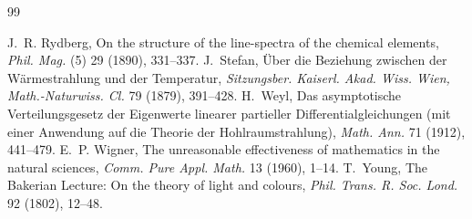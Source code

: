 \documentclass[11pt]{article}
\begin{document}
\begin{thebibliography}{99}
\begin{sloppypar}
 J.~R. Rydberg, On the structure of the line-spectra of the chemical elements, \emph{Phil. Mag.} (5) 29 (1890), 331--337.
 J.~Stefan, \"Uber die Beziehung zwischen der W\"armestrahlung und der Temperatur, \emph{Sitzungsber. Kaiserl. Akad. Wiss. Wien, Math.-Naturwiss. Cl.} 79 (1879), 391--428.
 H.~Weyl, Das asymptotische Verteilungsgesetz der Eigenwerte linearer partieller Differentialgleichungen (mit einer Anwendung auf die Theorie der Hohlraumstrahlung), \emph{Math. Ann.} 71 (1912), 441--479.
 E.~P. Wigner, The unreasonable effectiveness of mathematics in the natural sciences, \emph{Comm. Pure Appl. Math.} 13 (1960), 1--14.
 T.~Young, The Bakerian Lecture: On the theory of light and colours, \emph{Phil. Trans. R. Soc. Lond.} 92 (1802), 12--48.
\end{sloppypar}
\end{thebibliography}
\end{document}
